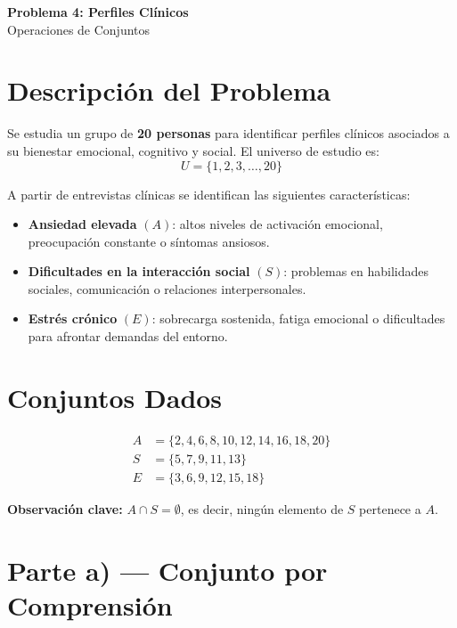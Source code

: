 \documentclass[12pt]{article}
\begin{document}
	
	\begin{center}
		{\Large \textbf{Problema 4: Perfiles Clínicos}} \\[4pt]
		{\large Operaciones de Conjuntos}
	\end{center}
	
	\bigskip
	
	\section*{Descripción del Problema}
	
	Se estudia un grupo de \textbf{20 personas} para identificar perfiles clínicos asociados
	a su bienestar emocional, cognitivo y social. El universo de estudio es:
	\[
	U = \{1, 2, 3, \ldots, 20\}
	\]
	
	A partir de entrevistas clínicas se identifican las siguientes características:
	\begin{itemize}
		\item \textbf{Ansiedad elevada} $(A)$: altos niveles de activación emocional,
		preocupación constante o síntomas ansiosos.
		\item \textbf{Dificultades en la interacción social} $(S)$: problemas en habilidades
		sociales, comunicación o relaciones interpersonales.
		\item \textbf{Estrés crónico} $(E)$: sobrecarga sostenida, fatiga emocional o
		dificultades para afrontar demandas del entorno.
	\end{itemize}
	
	\section*{Conjuntos Dados}
	
	\begin{align*}
		A &= \{2, 4, 6, 8, 10, 12, 14, 16, 18, 20\} \\[4pt]
		S &= \{5, 7, 9, 11, 13\} \\[4pt]
		E &= \{3, 6, 9, 12, 15, 18\}
	\end{align*}
	
	\noindent\textbf{Observación clave:} $A \cap S = \emptyset$, es decir, ningún elemento
	de $S$ pertenece a $A$.
	
	\bigskip
	
	\section*{Parte a) — Conjunto por Comprensión}
	
\end{document}
